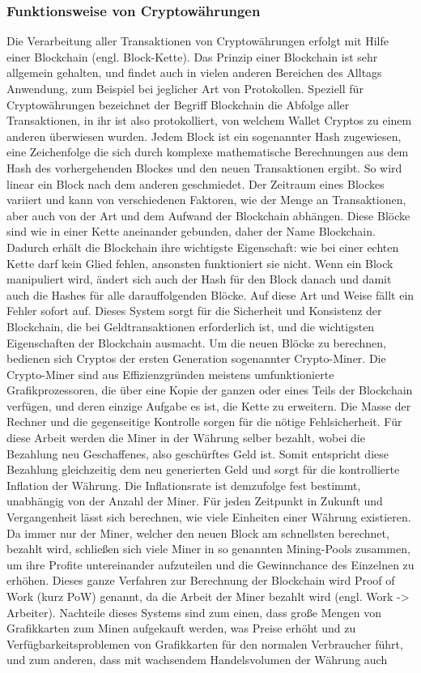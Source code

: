 \documentclass[12pt]{article}
\begin{document}
	\subsubsection{Funktionsweise von Cryptowährungen}
		Die Verarbeitung aller Transaktionen von Cryptowährungen erfolgt mit Hilfe einer Blockchain (engl. Block-Kette). Das Prinzip einer Blockchain ist sehr allgemein gehalten, und findet auch in vielen anderen Bereichen des Alltags Anwendung, zum Beispiel bei jeglicher Art von Protokollen. Speziell für Cryptowährungen bezeichnet der Begriff Blockchain die Abfolge aller Transaktionen, in ihr ist also protokolliert, von welchem Wallet Cryptos zu einem anderen überwiesen wurden. Jedem Block ist ein sogenannter Hash zugewiesen, eine Zeichenfolge die sich durch komplexe mathematische Berechnungen aus dem Hash des vorhergehenden Blockes und den neuen Transaktionen ergibt. So wird linear ein Block nach dem anderen geschmiedet. Der Zeitraum eines Blockes variiert und kann von verschiedenen Faktoren, wie der Menge an Transaktionen, aber auch von der Art und dem Aufwand der Blockchain abhängen. Diese Blöcke sind wie in einer Kette aneinander gebunden, daher der Name \glqq Blockchain\grqq{}. Dadurch erhält die Blockchain ihre wichtigste Eigenschaft: wie bei einer echten Kette darf kein Glied fehlen, ansonsten funktioniert sie nicht. Wenn ein Block manipuliert wird, ändert sich auch der Hash für den Block danach und damit auch die Hashes für alle darauffolgenden Blöcke. Auf diese Art und Weise fällt ein Fehler sofort auf. Dieses System sorgt für die Sicherheit und Konsistenz der Blockchain, die bei Geldtransaktionen erforderlich ist, und die wichtigsten Eigenschaften der Blockchain ausmacht. Um die neuen Blöcke zu berechnen, bedienen sich Cryptos der ersten Generation sogenannter Crypto-Miner. Die Crypto-Miner sind aus Effizienzgründen meistens umfunktionierte Grafikprozessoren, die über eine Kopie der ganzen oder eines Teils der Blockchain verfügen, und deren einzige Aufgabe es ist, die Kette zu erweitern. Die Masse der Rechner und die gegenseitige Kontrolle sorgen für die nötige Fehlsicherheit. Für diese Arbeit werden die Miner in der Währung selber bezahlt, wobei die Bezahlung neu Geschaffenes, also \glqq geschürftes\grqq{} Geld ist. Somit entspricht diese Bezahlung gleichzeitig dem neu generierten Geld und sorgt für die kontrollierte Inflation der Währung. Die Inflationsrate ist demzufolge fest bestimmt, unabhängig von der Anzahl der Miner. Für jeden Zeitpunkt in Zukunft und Vergangenheit lässt sich berechnen, wie viele Einheiten einer Währung existieren. Da immer nur der Miner, welcher den neuen Block am schnellsten berechnet, bezahlt wird, schließen sich viele Miner in so genannten Mining-Pools zusammen, um ihre Profite untereinander aufzuteilen und die Gewinnchance des Einzelnen zu erhöhen. Dieses ganze Verfahren zur Berechnung der Blockchain wird \glqq Proof of Work\grqq{} (kurz PoW) genannt, da die Arbeit der Miner bezahlt wird (engl. Work -> Arbeiter). Nachteile dieses Systems sind zum einen, dass große Mengen von Grafikkarten zum Minen aufgekauft werden, was Preise erhöht und zu Verfügbarkeitsproblemen von Grafikkarten für den normalen Verbraucher führt, und zum anderen, dass mit wachsendem Handelsvolumen der Währung auch 
\end{document}
